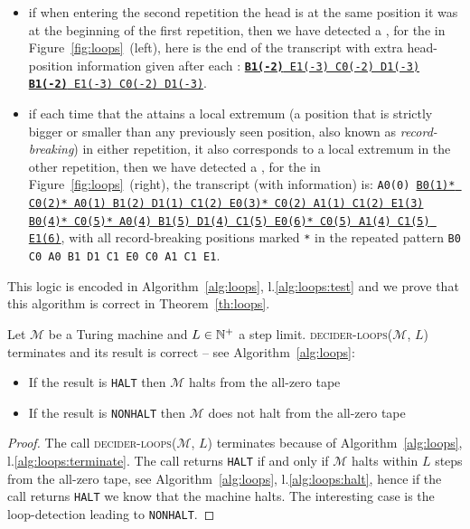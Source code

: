 \begin{itemize}
  \item if when entering the second repetition the head is at the same position it was at the beginning of the first repetition, then we have detected a \cycler, \eg for the \cycler in Figure~\ref{fig:loops}~(left), here is the end of the transcript with extra head-position information given after each \ssp: \texttt{\underline{\textbf{B1(-2)} E1(-3) C0(-2) D1(-3)} \underline{\textbf{B1(-2)} E1(-3) C0(-2) D1(-3)}}.

  \item if each time that the \headpos attains a local extremum (\ie a position that is strictly bigger or smaller than any previously seen position, also known as \textit{record-breaking}) in either repetition, it also corresponds to a local extremum in the other repetition, then we have detected a \TC, \eg for the \TC in Figure~\ref{fig:loops}~(right), the transcript (with \headpos information) is: \texttt{A0(0) \underline{B0(1)* C0(2)* A0(1) B1(2) D1(1) C1(2) E0(3)* C0(2) A1(1) C1(2) E1(3)} \\ \underline{B0(4)* C0(5)* A0(4) B1(5) D1(4) C1(5) E0(6)* C0(5) A1(4) C1(5) E1(6)}}, with all record-breaking positions marked \texttt{*} in the repeated \ssp pattern \texttt{B0 C0 A0 B1 D1 C1 E0 C0 A1 C1 E1}.

\end{itemize}

This logic is encoded in Algorithm~\ref{alg:loops}, l.\ref{alg:loops:test} and we prove that this algorithm is correct in Theorem~\ref{th:loops}.

\begin{theorem}\label{th:loops}
  Let $\mathcal{M}$ be a Turing machine and $L \in \mathbb{N}^+$ a step limit. \textsc{decider-loops}($\mathcal{M}$, $L$) terminates and its result is correct -- see Algorithm~\ref{alg:loops}:
  \begin{itemize}
    \item If the result is \texttt{HALT} then $\mathcal{M}$ halts from the all-zero tape
    \item If the result is \texttt{NONHALT} then $\mathcal{M}$ does not halt from the all-zero tape
  \end{itemize}
\end{theorem}
\begin{proof}
  The call \textsc{decider-loops}($\mathcal{M}$, $L$) terminates because of Algorithm~\ref{alg:loops}, l.\ref{alg:loops:terminate}. The call returns \texttt{HALT} if and only if $\mathcal{M}$ halts within $L$ steps from the all-zero tape, see Algorithm~\ref{alg:loops}, l.\ref{alg:loops:halt}, hence if the call returns \texttt{HALT} we know that the machine halts. The interesting case is the loop-detection leading to \texttt{NONHALT}.
\end{proof}


